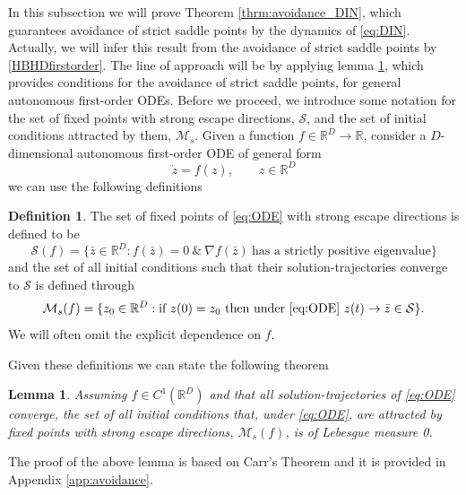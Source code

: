 \documentclass[reqno]{amsart}
\theoremstyle{plain}
\newtheorem{lemma}{Lemma}	%
\theoremstyle{definition}
\newtheorem{definition}{Definition}	%
\theoremstyle{remark}
\begin{document}
In this subsection we will prove Theorem \ref{thrm:avoidance_DIN}, which guarantees avoidance of strict saddle points by the dynamics of \eqref{eq:DIN}. 
Actually, we will infer this result from the avoidance of strict saddle points by \eqref{HBHDfirstorder}. 
The line of approach will be by applying lemma \ref{lemma:avoidstrong}, which provides conditions for the avoidance of strict saddle points, for general autonomous first-order ODEs. 
Before we proceed, we introduce some notation for the set of fixed points with strong escape directions, $\mathcal{S}$, and the set of initial conditions attracted by them, $\mathcal{M}_s$. 
Given a function $f\in\mathbb{R}^D\to\mathbb{R}$, consider a $D$-dimensional autonomous first-order ODE of general form 
\begin{equation} 
\label{eq:ODE}
    \dot{z} = f(z), \qquad z\in\mathbb{R}^D
\end{equation}
we can use the following definitions
\begin{definition}
    The set of fixed points of \eqref{eq:ODE} with strong escape directions is defined to be
    \begin{equation}
        \mathcal{S}(f)=\{\bar{z}\in\mathbb{R}^D:f(\bar{z})=0 \ \& \ \nabla f(\bar{z}) \ \text{has a strictly positive eigenvalue}\}
    \end{equation} 
    and the set of all initial conditions such that their solution-trajectories converge to $\mathcal{S}$ is defined through
    \begin{equation}
        \mathcal{M}_s(f) = \{z_0\in\mathbb{R}^D : \text{if} \ z(0)=z_0 \ \text{then under \eqref{eq:ODE}} \ z(t)\to\bar{z}\in\mathcal{S}\}.
    \end{equation} 
    We will often omit the explicit dependence on $f$. 
\end{definition}
Given these definitions we can state the following theorem
\begin{lemma}
\label{lemma:avoidstrong}
    Assuming $f \in C^1(\mathbb{R}^D)$ and that all solution-trajectories of \eqref{eq:ODE} converge, the set of all initial conditions that, under \eqref{eq:ODE}, are attracted by fixed points with strong escape directions, $\mathcal{M}_s(f)$, is of Lebesgue measure 0. 
\end{lemma} 
The proof of the above lemma is based on Carr's Theorem \cite{perko2013differential} and it is provided in Appendix \ref{app:avoidance}.
\end{document}
